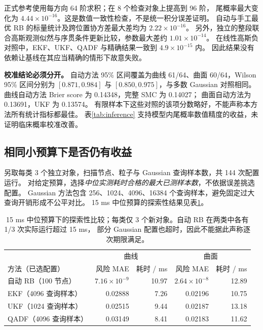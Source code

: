 \documentclass[11pt,a4paper]{article}
\numberwithin{equation}{section}
\theoremstyle{definition}
\begin{document}
正式参考使用每方向 64 阶求积；在 8 个检查对象上提高到 96 阶，
尾概率最大变化为 \(4.44\times10^{-16}\)。这是数值一致性检查，不是统一积分误差证明。
自动与手工最优 RB 的标量统计及跨位置协方差最大差均为 \(2.22\times10^{-16}\)。
另外，独立的整段联合高斯观测似然与序贯条件更新比较，参数最大差约 \(1.01\times10^{-14}\)。
在线性高斯负对照中，EKF、UKF、QADF 与精确结果一致到 \(4.9\times10^{-15}\) 内。
因此结果没有依赖让基线在其应当精确的情形下故意失败。

\textbf{校准结论必须分开。}
自动方法 95\% 区间覆盖为曲线 61/64、曲面 60/64，Wilson 95\% 区间分别为
\([0.871,0.984]\) 与 \([0.850,0.975]\)，与多数 Gaussian 对照相同。
曲线自动方法 Brier score 为 0.14348，完整 SMC 为 0.14027；
曲面自动方法为 0.13691，UKF 为 0.13574。
有限样本下这些对照的该项分数略好，不能声称本方法所有统计指标都最佳。
表\ref{tab:inference} 支持模型内尾概率数值精度的收益，未证明临床概率校准改善。

\subsection{相同小预算下是否仍有收益}
另取每类 3 个独立对象，扫描节点、粒子与 Gaussian 查询样本数，共 144 次配置运行。
对给定预算，选择\emph{中位实测耗时合格的最大已测样本数}，不依据误差挑选配置。
Gaussian 方法包含 256、1024、4096、16384 个查询样本，避免固定过大查询开销形成不公平对比。
15 ms 中位预算的探索性结果见表\ref{tab:budget}。

\begin{table}[ht]
\centering\small
\begin{tabular}{lrrrr}
\toprule
 & \multicolumn{2}{c}{曲线} & \multicolumn{2}{c}{曲面}\\
方法（已选配置） & 风险 MAE & 耗时 / ms & 风险 MAE & 耗时 / ms\\
\midrule
自动 RB（100 节点） & \(7.16\!\times\!10^{-9}\) & 10.97 & \(2.64\!\times\!10^{-8}\) & 12.89\\
EKF（4096 查询样本） & 0.02888 & 7.26 & 0.02196 & 10.75\\
UKF（1024 查询样本） & 0.02515 & 9.44 & 0.02187 & 13.18\\
QADF（4096 查询样本） & 0.03149 & 8.41 & 0.02183 & 11.62\\
\bottomrule
\end{tabular}
\caption{15 ms 中位预算下的探索性比较；每类仅 3 个新对象。自动 RB 在两类中各有 1/3 次实际运行超过 15 ms，
部分 Gaussian 配置也超时，因此不能据此声称逐次期限满足。}
\label{tab:budget}
\end{table}
\end{document}
